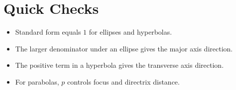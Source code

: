 \documentclass[11pt]{article}
\begin{document}
\section*{Quick Checks}
\begin{itemize}
  \item Standard form equals $1$ for ellipses and hyperbolas.
  \item The larger denominator under an ellipse gives the major axis direction.
  \item The positive term in a hyperbola gives the transverse axis direction.
  \item For parabolas, $p$ controls focus and directrix distance.
\end{itemize}
\end{document}
